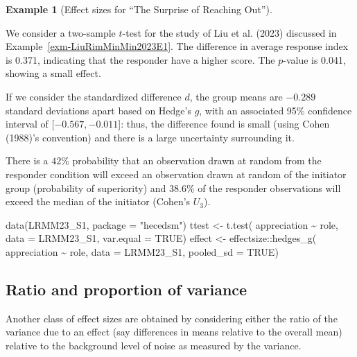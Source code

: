 \documentclass[
  11pt,
  letterpaper,
]{scrbook}
\newenvironment{Shaded}{\begin{snugshade}}{\end{snugshade}}
\newcommand{\AttributeTok}[1]{\textcolor[rgb]{0.40,0.45,0.13}{#1}}
\newcommand{\ConstantTok}[1]{\textcolor[rgb]{0.56,0.35,0.01}{#1}}
\newcommand{\FunctionTok}[1]{\textcolor[rgb]{0.28,0.35,0.67}{#1}}
\newcommand{\NormalTok}[1]{\textcolor[rgb]{0.00,0.23,0.31}{#1}}
\newcommand{\OtherTok}[1]{\textcolor[rgb]{0.00,0.23,0.31}{#1}}
\newcommand{\SpecialCharTok}[1]{\textcolor[rgb]{0.37,0.37,0.37}{#1}}
\newcommand{\StringTok}[1]{\textcolor[rgb]{0.13,0.47,0.30}{#1}}
\theoremstyle{definition}
\newtheorem{example}{Example}[chapter]
\theoremstyle{definition}
\theoremstyle{remark}
\begin{document}
\begin{example}[Effect sizes for ``The Surprise of Reaching
Out'']\protect\hypertarget{exm-LiuRimMinMin2023E1effect}{}\label{exm-LiuRimMinMin2023E1effect}

We consider a two-sample \(t\)-test for the study of Liu et al. (2023)
discussed in Example~\ref{exm-LiuRimMinMin2023E1}. The difference in
average response index is 0.371, indicating that the responder have a
higher score. The \(p\)-value is 0.041, showing a small effect.

If we consider the standardized difference \(d\), the group means are
\(-0.289\) standard deviations apart based on Hedge's \(g\), with an
associated 95\% confidence interval of {[}\(-0.567, -0.011\){]}: thus,
the difference found is small (using Cohen (1988)'s convention) and
there is a large uncertainty surrounding it.

There is a \(42\)\% probability that an observation drawn at random from
the responder condition will exceed an observation drawn at random of
the initiator group (probability of superiority) and \(38.6\)\% of the
responder observations will exceed the median of the initiator (Cohen's
\(U_3\)).

\begin{Shaded}
\begin{Highlighting}[]
\FunctionTok{data}\NormalTok{(LRMM23\_S1, }\AttributeTok{package =} \StringTok{"hecedsm"}\NormalTok{)}
\NormalTok{ttest }\OtherTok{\textless{}{-}} \FunctionTok{t.test}\NormalTok{(}
\NormalTok{  appreciation }\SpecialCharTok{\textasciitilde{}}\NormalTok{ role, }
  \AttributeTok{data =}\NormalTok{ LRMM23\_S1,}
  \AttributeTok{var.equal =} \ConstantTok{TRUE}\NormalTok{)}
\NormalTok{effect }\OtherTok{\textless{}{-}}\NormalTok{ effectsize}\SpecialCharTok{::}\FunctionTok{hedges\_g}\NormalTok{(}
\NormalTok{  appreciation }\SpecialCharTok{\textasciitilde{}}\NormalTok{ role, }
  \AttributeTok{data =}\NormalTok{ LRMM23\_S1, }
  \AttributeTok{pooled\_sd =} \ConstantTok{TRUE}\NormalTok{)}
\end{Highlighting}
\end{Shaded}

\end{example}

\subsection{Ratio and proportion of
variance}\label{ratio-and-proportion-of-variance}

Another class of effect sizes are obtained by considering either the
ratio of the variance due to an effect (say differences in means
relative to the overall mean) relative to the background level of noise
as measured by the variance.
\end{document}
